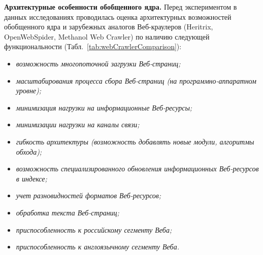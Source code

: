 \textbf{Архитектурные особенности обобщенного ядра.} Перед экспериментом в данных исследованиях проводилась оценка архитектурных возможностей обобщенного ядра и зарубежных аналогов Веб-краулеров (Heritrix, OpenWebSpider, Methanol Web Crawler) по наличию следующей функциональности (Табл.~\cref{tab:webCrawlerComparison}):
\begin{itemize}
	\item \textit{возможность многопоточной загрузки Веб-страниц;}
	\item \textit{масштабирования процесса сбора Веб-страниц (на программно-аппаратном уровне);}
	\item \textit{минимизация нагрузки на информационные Веб-ресурсы;}
	\item \textit{минимизации нагрузки на каналы связи;}
	\item \textit{гибкость архитектуры (возможность добавлять новые модули, алгоритмы обхода);}
	\item \textit{возможность специализированного обновления информационных Веб-ресурсов в индексе;}
	\item \textit{учет разновидностей форматов Веб-ресурсов;}
	\item \textit{обработка текста Веб-страниц;}
	\item \textit{приспособленность к российскому сегменту Веба;}
	\item \textit{приспособленность к англоязычному сегменту Веба.}
\end{itemize}

